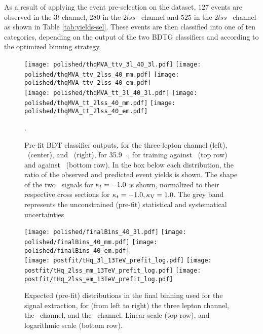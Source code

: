 As a result of applying the event pre-selection on the dataset, $127$ events are observed in the $3l$ channel, $280$ in the $2lss$ \mumu\ channel and  $525$ in the $2lss$ \emu\ channel as shown in Table \ref{tab:yields-sel}. These events are then classified into one of ten categories, depending on the output of the two BDTG classifiers and according to the optimized binning strategy.
\begin{figure}[!htb]
\begin{center}
 \centering
 \texttt{[image: polished/thqMVA\_ttv\_3l\_40\_3l.pdf]}
 \texttt{[image: polished/thqMVA\_ttv\_2lss\_40\_mm.pdf]}
 \texttt{[image: polished/thqMVA\_ttv\_2lss\_40\_em.pdf]}\\
 \texttt{[image: polished/thqMVA\_tt\_3l\_40\_3l.pdf]}
 \texttt{[image: polished/thqMVA\_tt\_2lss\_40\_mm.pdf]}
  \texttt{[image: polished/thqMVA\_tt\_2lss\_40\_em.pdf]}
\end{center}
\caption[Pre-fit BDT classifier outputs.]{Pre-fit BDT classifier outputs, for the three-lepton channel (left), \mumu\ (center), and \emu\ (right), for 35.9~ \fbinv, for training against \ttV\ (top row) and against \ttbar\ (bottom row). In the box below each distribution, the ratio of the observed and predicted event yields is shown. The shape of the two \tH\ signals for $\kappa_t=-1.0$ is shown, normalized to their respective cross sections for $\kappa_t=-1.0, \kappa_\text{V}=1.0$. The grey band represents the unconstrained (pre-fit) statistical and systematical uncertainties \label{fig:bdt_outputs_prefit}}.
\end{figure}

\begin{figure} [!h]
 \centering
 \texttt{[image: polished/finalBins\_40\_3l.pdf]}
 \texttt{[image: polished/finalBins\_40\_mm.pdf]}
 \texttt{[image: polished/finalBins\_40\_em.pdf]} \\
 \texttt{[image: postfit/tHq\_3l\_13TeV\_prefit\_log.pdf]}
 \texttt{[image: postfit/tHq\_2lss\_mm\_13TeV\_prefit\_log.pdf]}
 \texttt{[image: postfit/tHq\_2lss\_em\_13TeV\_prefit\_log.pdf]}
\caption[Pre-fit distributions in the final binning.]{Expected (pre-fit) distributions in the final binning used for the signal extraction, for (from left to right) the three lepton channel, the \mumu\ channel, and the \emu\ channel. Linear scale (top row), and logarithmic scale (bottom row).}
\label{fig:finalbins_prefit}
\end{figure}

